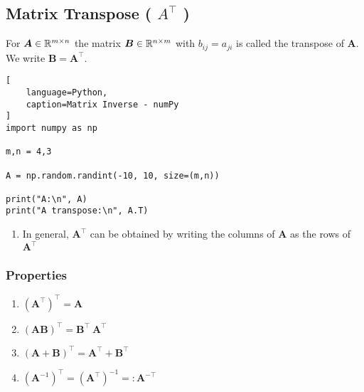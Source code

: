 \subsection{Matrix Transpose ( $A^{\top}$ ) \cite{mfml/book/mml/Deisenroth-Faisal-Ong}}

For $\bm{A} \in \mathbb{R}^{m\times n}$ the matrix $\bm{B} \in \mathbb{R}^{n\times m}$ with $b_{ij} = a_{ji}$ is called the transpose of $\bm{A}$. 
We write $\bm{B} = \bm{A}^\top$.
\hfill \cite{mfml/book/mml/Deisenroth-Faisal-Ong}






\begin{lstlisting}[
    language=Python,
    caption=Matrix Inverse - numPy
]
import numpy as np

m,n = 4,3

A = np.random.randint(-10, 10, size=(m,n))

print("A:\n", A)
print("A transpose:\n", A.T)
\end{lstlisting}







\begin{enumerate}
    \item In general, $\bm{A}^\top$ can be obtained by writing the columns of $\bm{A}$ as the rows of $\bm{A}^\top$
    \hfill \cite{mfml/book/mml/Deisenroth-Faisal-Ong}
\end{enumerate}



\subsubsection{Properties}

\begin{multicols}{2}
\begin{enumerate}
    \item $(\bm{A}^\top)^\top = \bm{A}$
    \hfill \cite{mfml/book/mml/Deisenroth-Faisal-Ong}

    \item $(\bm{AB})^\top = \bm{B}^\top\ \bm{A}^\top$
    \hfill \cite{mfml/book/mml/Deisenroth-Faisal-Ong}

    \item $(\bm{A}+\bm{B})^\top = \bm{A}^\top + \bm{B}^\top$
    \hfill \cite{mfml/book/mml/Deisenroth-Faisal-Ong}

    \item $(\bm{A}^{-1})^\top = (\bm{A}^\top)^{-1} =: \bm{A}^{-\top}$
    \hfill \cite{mfml/book/mml/Deisenroth-Faisal-Ong}

\end{enumerate}
\end{multicols}








